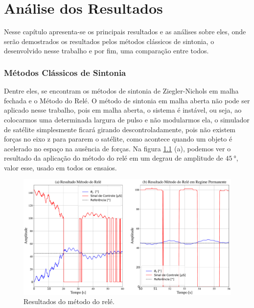 \chapter{Análise dos Resultados}

Nesse capítulo apresenta-se os principais resultados e as análises sobre eles, onde serão demostrados os resultados pelos métodos clássicos de sintonia, o desenvolvido nesse trabalho e por fim, uma comparação entre todos.


\subsection{Métodos Clássicos de Sintonia}

Dentre eles, se encontram os métodos de sintonia de Ziegler-Nichols em malha fechada e o Método do Relé. O método de sintonia em malha aberta não pode ser aplicado nesse trabalho, pois em malha aberta, o sistema é instável, ou seja, ao colocarmos uma determinada largura de pulso e não modularmos ela, o simulador de satélite simplesmente ficará girando descontroladamente, pois não existem forças no eixo z para pararem o satélite, como acontece quando um objeto é acelerado no espaço na ausência de forças. Na figura \ref{fig:relay} (a), podemos ver o resultado da aplicação do método do relé em um degrau de amplitude de $\SI{45}{\degree}$, valor esse, usado em todos os ensaios.

\begin{figure}[H]
  \caption{Resultados do método do relé.}
  \begin{center}
      \includegraphics[scale=0.35]{resultados/img/relay}
  \end{center}
  \label{fig:relay}
\end{figure}
 
